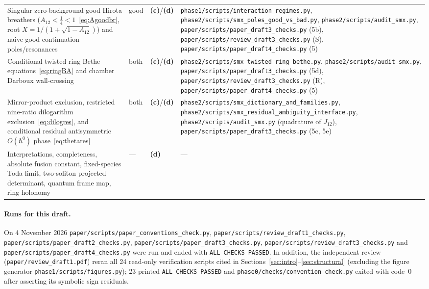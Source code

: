\documentclass[11pt,a4paper]{article}
\newcommand{\lab}[1]{{\normalfont\sffamily\footnotesize\bfseries(#1)}}
\newcommand{\Lc}{\lab{c}}
\newcommand{\Ld}{\lab{d}}
\newcommand{\scr}[1]{\nolinkurl{#1}}
\newcommand{\hb}{\hbar}
\theoremstyle{remark}
\begin{document}
\begin{longtable}{@{}>{\raggedright}p{5.4cm}>{\raggedright}p{1.3cm}>{\raggedright}p{0.75cm}>{\raggedright\arraybackslash}p{6.55cm}@{}}
Singular zero-background good Hirota breathers ($A_{12}<\tfrac14<1$~\eqref{eq:Agoodbr}, root $X=1/(1+\sqrt{1-A_{12}})$) and naive good-continuation poles/resonances & good & \Lc/\Ld & \scr{phase1/scripts/interaction_regimes.py}, \scr{phase2/scripts/smx_poles_good_vs_bad.py}, \scr{phase2/scripts/audit_smx.py}, \scr{paper/scripts/paper_draft3_checks.py} (5b), \nolinkurl{paper/scripts/review_draft3_checks.py} (S), \nolinkurl{paper/scripts/paper_draft4_checks.py} (5)\\
Conditional twisted ring Bethe equations~\eqref{eq:ringBA} and chamber Darboux wall-crossing & both & \Lc/\Ld & \scr{phase2/scripts/smx_twisted_ring_bethe.py}, \scr{phase2/scripts/audit_smx.py}, \scr{paper/scripts/paper_draft3_checks.py} (5d), \nolinkurl{paper/scripts/review_draft3_checks.py} (R), \nolinkurl{paper/scripts/paper_draft4_checks.py} (5)\\
Mirror-product exclusion, restricted nine-ratio dilogarithm exclusion~\eqref{eq:dilogres}, and conditional residual antisymmetric $O(\hb^0)$ phase~\eqref{eq:thetares} & both & \Lc/\Ld & \scr{phase2/scripts/smx_dictionary_and_families.py}, \scr{phase2/scripts/smx_residual_ambiguity_interface.py}, \scr{phase2/scripts/audit_smx.py} (quadrature of $J_{12}$), \scr{paper/scripts/paper_draft3_checks.py} (5c, 5e)\\
Interpretations, completeness, absolute fusion constant, fixed-species Toda limit, two-soliton projected determinant, quantum frame map, ring holonomy & --- & \Ld & ---\\
\bottomrule
\end{longtable}
\endgroup

\begingroup\raggedright
\paragraph{Runs for this draft.} On 4 November 2026 \scr{paper/scripts/paper_conventions_check.py}, \scr{paper/scripts/review_draft1_checks.py}, \scr{paper/scripts/paper_draft2_checks.py}, \scr{paper/scripts/paper_draft3_checks.py}, \nolinkurl{paper/scripts/review_draft3_checks.py} and \nolinkurl{paper/scripts/paper_draft4_checks.py} were run and ended with \texttt{ALL CHECKS PASSED}. In addition, the independent review (\scr{paper/review_draft1.pdf}) reran all 24 read-only verification scripts cited in Sections~\ref{sec:intro}--\ref{sec:structural} (excluding the figure generator \scr{phase1/scripts/figures.py}); 23 printed \texttt{ALL CHECKS PASSED} and \scr{phase0/checks/convention_check.py} exited with code~0 after asserting its symbolic sign residuals.\par
\endgroup
\end{document}
